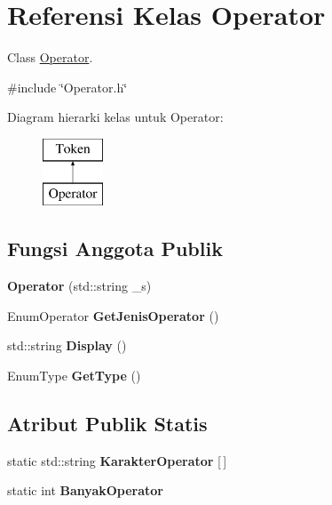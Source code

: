 \hypertarget{classOperator}{}\section{Referensi Kelas Operator}
\label{classOperator}


Class \hyperlink{classOperator}{Operator}.  




{\ttfamily \#include \char`\"{}Operator.\+h\char`\"{}}

Diagram hierarki kelas untuk Operator\+:\begin{figure}[H]
\begin{center}
\leavevmode
\includegraphics[height=2.000000cm]{d4/dad/classOperator}
\end{center}
\end{figure}
\subsection*{Fungsi Anggota Publik}
\begin{DoxyCompactItemize}
\item 
\hypertarget{classOperator_a2199e61dda5314db8401081f2178d9a9}{}{\bfseries Operator} (std\+::string \+\_\+s)\label{classOperator_a2199e61dda5314db8401081f2178d9a9}

\item 
\hypertarget{classOperator_af0113b1134d9e54abd2a05ea69c63238}{}Enum\+Operator {\bfseries Get\+Jenis\+Operator} ()\label{classOperator_af0113b1134d9e54abd2a05ea69c63238}

\item 
\hypertarget{classOperator_a97faadd3b0c23c108eba25c409b0003d}{}std\+::string {\bfseries Display} ()\label{classOperator_a97faadd3b0c23c108eba25c409b0003d}

\item 
\hypertarget{classOperator_a52745643d188234ebac14062af0fb69c}{}Enum\+Type {\bfseries Get\+Type} ()\label{classOperator_a52745643d188234ebac14062af0fb69c}

\end{DoxyCompactItemize}
\subsection*{Atribut Publik Statis}
\begin{DoxyCompactItemize}
\item 
\hypertarget{classOperator_a932146b92cb0b726be4ec8674af116f4}{}static std\+::string {\bfseries Karakter\+Operator} \mbox{[}$\,$\mbox{]}\label{classOperator_a932146b92cb0b726be4ec8674af116f4}

\item 
\hypertarget{classOperator_a8064c68677326d96415034012d90ba7d}{}static int {\bfseries Banyak\+Operator}\label{classOperator_a8064c68677326d96415034012d90ba7d}

\end{DoxyCompactItemize}



